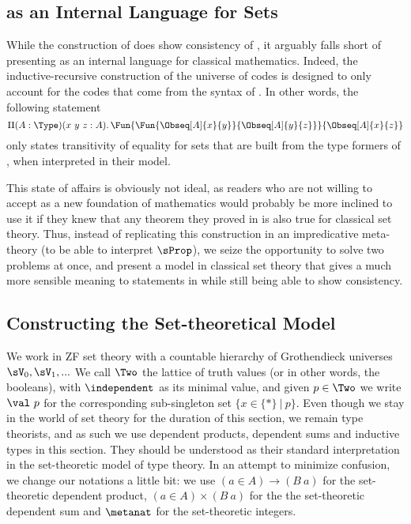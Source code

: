 \subsection{\SetoidCC as an Internal Language for Sets}

While the construction of  does show consistency of
\SetoidTT, it arguably falls short of presenting \SetoidTT as an internal
language for classical mathematics.
%
Indeed, the inductive-recursive construction of the universe of codes is
designed to only account for the codes that come from the syntax of
\SetoidTT. In other words, the following statement
\[
\Pi(A : \Type)(x\ y\ z : A).\,\Fun{\Fun{\Obseq[A]{x}{y}}{\Obseq[A]{y}{z}}}{\Obseq[A]{x}{z}}
\]
only states transitivity of equality for sets that are built from
the type formers of \SetoidTT, when interpreted in their model.

This state of affairs is obviously not ideal, as readers who are not
willing to accept \SetoidCC as a new foundation of mathematics would
probably be more inclined to use it if they knew that any theorem they
proved in \SetoidCC is also true for classical set theory.
%
Thus, instead of replicating this construction in an impredicative
meta-theory (to be able to interpret \( \sProp \)), we seize the
opportunity to solve two problems at once, and present a model in classical
set theory that gives a much more sensible meaning to statements in \SetoidCC
while still being able to show consistency.

\subsection{Constructing the Set-theoretical Model}

We work in ZF set theory with a countable hierarchy of Grothendieck universes
\( \sV_0, \sV_1, ... \)
%
We call \( \Two \) the lattice of truth values (or in other words, the
booleans), with \( \independent \) as its minimal value,
and given \( p \in \Two \) we write \( \val\ p \) for the
corresponding sub-singleton set \( \{ x \in \{ * \}\ |\ p \} \).
%
Even though we stay in the world of set theory for the duration of
this section, we remain type theorists, and as such
we use dependent products, dependent sums and inductive types in this
section. They should be understood as their standard interpretation in
the set-theoretic model of type theory.
%
In an attempt to minimize confusion, we change our notations a little
bit: we use \( (a \in A) \to (B\ a) \) for the set-theoretic dependent product,
\( (a \in A) \times (B\ a) \) for the the set-theoretic dependent sum and
\( \metanat \) for the set-theoretic integers.

